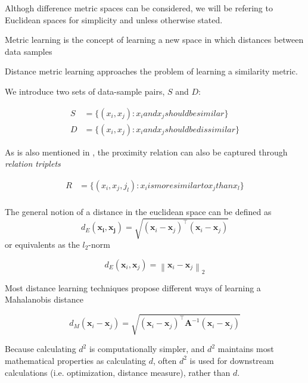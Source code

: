 \documentclass[a4paper,12pt,twoside,openright]{report}
\begin{document}
Althogh difference metric spaces can be considered, we will be refering to Euclidean spaces for simplicity and unless otherwise stated.

Metric learning is the concept of learning a new space in which distances between data samples 

Distance metric learning approaches the problem of learning a similarity metric.

We introduce two sets of data-sample pairs, $S$ and $D$:

\begin{align}
S &= \{ (x_i, x_j) : x_i and x_j should be similar\} \\
D &= \{ (x_i, x_j) : x_i and x_j should be dissimilar\}
\end{align}

As is also mentioned in \cite{moutafis17}, the proximity relation can also be captured through \textit{relation triplets}

\begin{align}
R &= \{ (x_i, x_j, j_l) : x_i is more similar to x_j than x_l \} \\
\end{align}

The general notion of a distance in the euclidean space can be defined as 
\begin{equation}
d_{E}\left(\boldsymbol{x}_{\boldsymbol{i}}, \boldsymbol{x}_{\boldsymbol{j}}\right)=\sqrt{\left(\boldsymbol{x}_{i}-\boldsymbol{x}_{j}\right)^{\top}\left(\boldsymbol{x}_{i}-\boldsymbol{x}_{j}\right)}
\end{equation}
or equivalents as the $l_2$-norm

\begin{equation}
d_{E}\left(\boldsymbol{x}_{i}, \boldsymbol{x}_{j}\right)=\left\|\boldsymbol{x}_{i}-\boldsymbol{x}_{j}\right\|_{2}
\end{equation}

Most distance learning techniques propose different ways of learning a Mahalanobis distance \cite{mahalanobis36}

\begin{equation}
d_{M}\left(\boldsymbol{x}_{i}-\boldsymbol{x}_{j}\right)=\sqrt{\left(\boldsymbol{x}_{i}-\boldsymbol{x}_{j}\right)^{\top} \boldsymbol{A}^{-1}\left(\boldsymbol{x}_{i}-\boldsymbol{x}_{j}\right)}
\end{equation}

Because calculating $d^2$ is computationally simpler, and $d^2$ maintains most mathematical properties as calculating $d$, often $d^2$ is used for downstream calculations (i.e. optimization, distance measure), rather than $d$.
\end{document}
